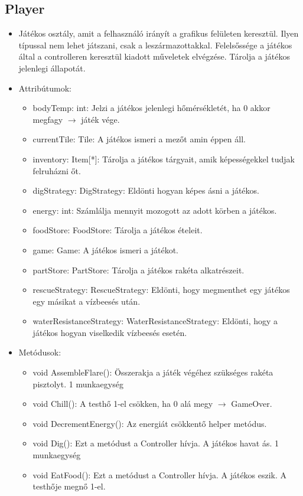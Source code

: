\subsection{Player}
\begin{itemize}
	\item Játékos osztály, amit a felhasználó irányít a grafikus felületen keresztül. Ilyen típussal nem lehet játszani, csak a leszármazottakkal. Felelsőssége a játékos által a controlleren keresztül kiadott műveletek elvégzése. Tárolja a játékos jelenlegi állapotát.
	\item Attribútumok:
	\begin{itemize}
		\item bodyTemp: int: Jelzi a játékos jelenlegi hőmérsékletét, ha 0 akkor megfagy $\rightarrow$ játék vége.
		\item currentTile: Tile: A játékos ismeri a mezőt amin éppen áll.
		\item inventory: Item[*]: Tárolja a játékos tárgyait, amik képességekkel tudjak felruházni őt.
		\item digStrategy: DigStrategy: Eldönti hogyan képes ásni a játékos.
		\item energy: int: Számlálja mennyit mozogott az adott körben a játékos.
		\item foodStore: FoodStore: Tárolja a játékos ételeit.
		\item game: Game: A játékos ismeri a játékot.
		\item partStore: PartStore: Tárolja a játékos rakéta alkatrészeit.
		\item rescueStrategy: RescueStrategy: Eldönti, hogy megmenthet egy játékos egy másikat a vízbeesés után.
		\item waterResistanceStrategy: WaterResistanceStrategy: Eldönti, hogy a játékos hogyan viselkedik vízbeesés esetén.
	\end{itemize}
	\item Metódusok:
	\begin{itemize}
		\item void AssembleFlare(): Összerakja a játék végéhez szükséges rakéta pisztolyt. 1 munkaegység
		\item void Chill(): A testhő 1-el csökken, ha 0 alá megy $\rightarrow$ GameOver.
		\item void DecrementEnergy(): Az energiát csökkentő helper metódus.
		\item void Dig(): Ezt a metódust a Controller hívja. A játékos havat ás. 1 munkaegység
		\item void EatFood(): Ezt a metódust a Controller hívja. A játékos eszik. A testhője megnő 1-el.

\end{itemize}
\end{itemize}
